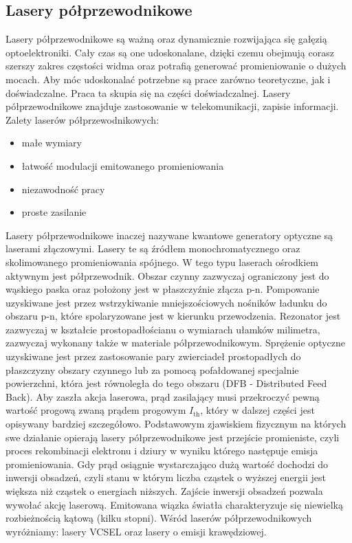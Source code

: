 \subsection{Lasery półprzewodnikowe}
Lasery półprzewodnikowe są ważną oraz dynamicznie rozwijająca się gałęzią optoelektroniki. Cały czas są one udoskonalane, dzięki czemu obejmują corasz szerszy zakres częstości widma oraz potrafią generować promieniowanie o dużych mocach.
Aby móc udoskonalać potrzebne są prace zarówno teoretyczne, jak i doświadczalne. Praca ta skupia się na części doświadczalnej.
Lasery półprzewodnikowe znajduje zastosowanie w telekomunikacji, zapisie informacji.
Zalety laserów półprzewodnikowych:
\begin{itemize}
\item małe wymiary
\item łatwość modulacji emitowanego promieniowania
\item niezawodność pracy
\item proste zasilanie
\end{itemize}
 \newpage
Lasery półprzewodnikowe inaczej nazywane kwantowe generatory optyczne są laserami złączowymi. Lasery te są źródłem
monochromatycznego oraz skolimowanego promieniowania spójnego. W tego typu laserach ośrodkiem aktywnym jest półprzewodnik.
Obszar czynny zazwyczaj ograniczony jest do wąskiego paska oraz położony jest w płaszczyźnie złącza p-n.
Pompowanie uzyskiwane jest przez wstrzykiwanie mniejszościowych nośników ładunku do obszaru p-n, które spolaryzowane jest w kierunku przewodzenia.
Rezonator jest zazwyczaj w kształcie prostopadłościanu o wymiarach ułamków milimetra, zazwyczaj wykonany także w materiale półprzewodnikowym\cite{publikcja_nakwaski}.
Sprężenie optyczne uzyskiwane jest przez zastosowanie pary zwierciadeł prostopadłych do płaszczyzny obszary czynnego lub
za pomocą pofałdowanej specjalnie powierzchni, która jest równoległa do tego obszaru (DFB - Distributed Feed Back).
Aby zaszła akcja laserowa, prąd zasilający musi przekroczyć pewną wartość progową zwaną prądem progowym $I_{\mathrm{th}}$, który w dalszej części jest
opisywany bardziej szczegółowo.
Podstawowym zjawiskiem fizycznym na których swe działanie opierają lasery półprzewodnikowe jest przejście promieniste, czyli proces rekombinacji elektronu i dziury w wyniku którego następuje emisja promieniowania. Gdy prąd osiągnie wystarczająco
dużą wartość dochodzi do inwersji obsadzeń, czyli stanu w którym liczba cząstek o wyższej energii jest większa niż cząstek o energiach niższych.
 Zajście inwersji obsadzeń pozwala wywołać akcję laserową. Emitowana wiązka światła charakteryzuje się niewielką rozbieżnością kątową (kilku stopni). Wśród laserów półprzewodnikowych
wyróżniamy: lasery VCSEL oraz lasery o emisji krawędziowej.

